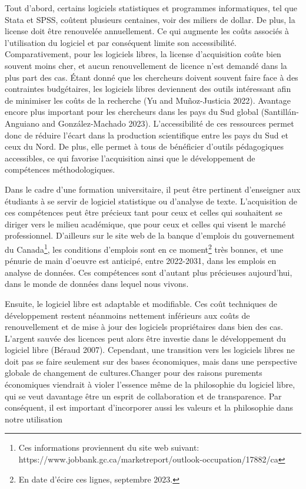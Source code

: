\documentclass[
  letterpaper,
]{scrbook}
\begin{document}
Tout d'abord, certains logiciels statistiques et programmes
informatiques, tel que Stata et SPSS, coûtent plusieurs centaines, voir
des miliers de dollar. De plus, la license doit être renouvelée
annuellement. Ce qui augmente les coûts associés à l'utilisation du
logiciel et par conséquent limite son accessibilité. Comparativement,
pour les logiciels libres, la license d'acquisition coûte bien souvent
moins cher, et aucun renouvellement de licence n'est demandé dans la
plus part des cas. Étant donné que les chercheurs doivent souvent faire
face à des contraintes budgétaires, les logiciels libres deviennent des
outils intéressant afin de minimiser les coûts de la recherche (Yu and
Muñoz-Justicia 2022). Avantage encore plus important pour les chercheurs
dans les pays du Sud global (Santillán-Anguiano and González-Machado
2023). L'accessibilité de ces ressources permet donc de réduire l'écart
dans la production scientifique entre les pays du Sud et ceux du Nord.
De plus, elle permet à tous de bénéficier d'outils pédagogiques
accessibles, ce qui favorise l'acquisition ainsi que le développement de
compétences méthodologiques.

Dans le cadre d'une formation universitaire, il peut être pertinent
d'enseigner aux étudiants à se servir de logiciel statistique ou
d'analyse de texte. L'acquisition de ces compétences peut être précieux
tant pour ceux et celles qui souhaitent se diriger vers le milieu
académique, que pour ceux et celles qui visent le marché professionnel.
D'ailleurs sur le site web de la banque d'emplois du gouvernement du
Canada\footnote{Ces informations proviennent du site web suivant:
  https://www.jobbank.gc.ca/marketreport/outlook-occupation/17882/ca},
les conditions d'emplois sont en ce moment\footnote{En date d'écire ces
  lignes, septembre 2023.} très bonnes, et une pénurie de main d'oeuvre
est anticipé, entre 2022-2031, dans les emplois en analyse de données.
Ces compétences sont d'autant plus précieuses aujourd'hui, dans le monde
de données dans lequel nous vivons.

Ensuite, le logiciel libre est adaptable et modifiable. Ces coût
techniques de développement restent néanmoins nettement inférieurs aux
coûts de renouvellement et de mise à jour des logiciels propriétaires
dans bien des cas. L'argent sauvée des licences peut alors être investie
dans le développement du logiciel libre (Béraud 2007). Cependant, une
transition vers les logiciels libres ne doit pas se faire seulement sur
des bases économiques, mais dans une perspective globale de changement
de cultures.Changer pour des raisons purements économiques viendrait à
violer l'essence même de la philosophie du logiciel libre, qui se veut
davantage être un esprit de collaboration et de transparence. Par
conséquent, il est important d'incorporer aussi les valeurs et la
philosophie dans notre utilisation
\end{document}
